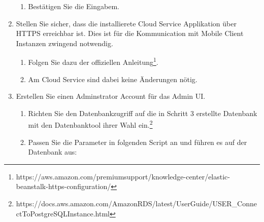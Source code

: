 \begin{enumerate}
\begin{enumerate}
        \item Bestätigen Sie die Eingabem.
    \end{enumerate}
    \item Stellen Sie sicher, dass die installierete Cloud Service Applikation über HTTPS erreichbar ist. Dies ist für die Kommunication mit Mobile Client Instanzen zwingend notwendig.
    \begin{enumerate}
        \item Folgen Sie dazu der offiziellen Anleitung\footnote{https://aws.amazon.com/premiumsupport/knowledge-center/elastic-beanstalk-https-configuration/}.
        \item Am Cloud Service sind dabei keine Änderungen nötig. 
    \end{enumerate}
    \item Erstellen Sie einen Adminstrator Account für das Admin UI.
    \begin{enumerate}
        \item Richten Sie den Datenbankzugriff auf die in Schritt 3 erstellte Datenbank mit den Datenbanktool ihrer Wahl ein.\footnote{https://docs.aws.amazon.com/AmazonRDS/latest/UserGuide/USER_ConnectToPostgreSQLInstance.html}
        \item Passen Sie die Parameter in folgenden Script an und führen es auf der Datenbank aus:
        

    \end{enumerate}

\end{enumerate}


\clearpage
